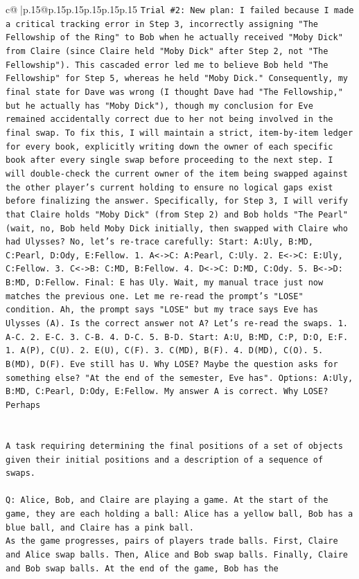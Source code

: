 \documentclass{article}
\begin{document}
{\begin{supertabular}{c@{$\;$}|p{.15\linewidth}@{}p{.15\linewidth}p{.15\linewidth}p{.15\linewidth}p{.15\linewidth}p{.15\linewidth}}
{{{\texttt{Trial \#2: New plan: I failed because I made a critical tracking error in Step 3, incorrectly assigning "The Fellowship of the Ring" to Bob when he actually received "Moby Dick" from Claire (since Claire held "Moby Dick" after Step 2, not "The Fellowship"). This cascaded error led me to believe Bob held "The Fellowship" for Step 5, whereas he held "Moby Dick." Consequently, my final state for Dave was wrong (I thought Dave had "The Fellowship," but he actually has "Moby Dick"), though my conclusion for Eve remained accidentally correct due to her not being involved in the final swap. To fix this, I will maintain a strict, item{-}by{-}item ledger for every book, explicitly writing down the owner of each specific book after every single swap before proceeding to the next step. I will double{-}check the current owner of the item being swapped against the other player's current holding to ensure no logical gaps exist before finalizing the answer. Specifically, for Step 3, I will verify that Claire holds "Moby Dick" (from Step 2) and Bob holds "The Pearl" (wait, no, Bob held Moby Dick initially, then swapped with Claire who had Ulysses? No, let's re{-}trace carefully: Start: A:Uly, B:MD, C:Pearl, D:Ody, E:Fellow. 1. A<{-}>C: A:Pearl, C:Uly. 2. E<{-}>C: E:Uly, C:Fellow. 3. C<{-}>B: C:MD, B:Fellow. 4. D<{-}>C: D:MD, C:Ody. 5. B<{-}>D: B:MD, D:Fellow. Final: E has Uly. Wait, my manual trace just now matches the previous one. Let me re{-}read the prompt's "LOSE" condition. Ah, the prompt says "LOSE" but my trace says Eve has Ulysses (A). Is the correct answer not A? Let's re{-}read the swaps. 1. A{-}C. 2. E{-}C. 3. C{-}B. 4. D{-}C. 5. B{-}D. Start: A:U, B:MD, C:P, D:O, E:F. 1. A(P), C(U). 2. E(U), C(F). 3. C(MD), B(F). 4. D(MD), C(O). 5. B(MD), D(F). Eve still has U. Why LOSE? Maybe the question asks for something else? "At the end of the semester, Eve has". Options: A:Uly, B:MD, C:Pearl, D:Ody, E:Fellow. My answer A is correct. Why LOSE? Perhaps} \\
\\ 
\\ 
\texttt{A task requiring determining the final positions of a set of objects given their initial positions and a description of a sequence of swaps.} \\
\\ 
\texttt{Q: Alice, Bob, and Claire are playing a game. At the start of the game, they are each holding a ball: Alice has a yellow ball, Bob has a blue ball, and Claire has a pink ball.} \\
\texttt{As the game progresses, pairs of players trade balls. First, Claire and Alice swap balls. Then, Alice and Bob swap balls. Finally, Claire and Bob swap balls. At the end of the game, Bob has the} \\
}}}
\end{supertabular}}
\end{document}
